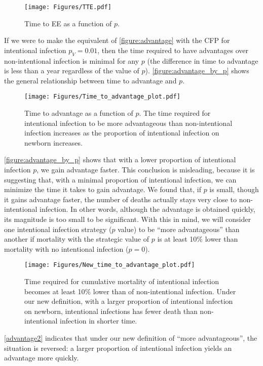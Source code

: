 \documentclass[12pt]{article}
\newcommand{\pmV}{p_{V}}
\begin{document}
\begin{figure}[H]
  \centering
  \texttt{[image: Figures/TTE.pdf]}
  \caption{Time to EE as a function of $p$.}
\label{figure:EE_by_p}
\end{figure}

If we were to make the equivalent of \autoref{figure:advantage} with the CFP for intentional infection $\pmV=0.01$, then the time required to have advantages over non-intentional infection is minimal for any $p$ (the difference in time to advantage is less than a year regardless of the value of $p$).
\autoref{figure:advantage_by_p} shows the general relationship between time to advantage and $p$.

\begin{figure}[H]
  \centering
  \texttt{[image: Figures/Time\_to\_advantage\_plot.pdf]}
  \caption{Time to advantage as a function of $p$. The time required for intentional infection to be more advantageous than non-intentional infection increases as the proportion of intentional infection on newborn increases.}
\label{figure:advantage_by_p}
\end{figure}

\autoref{figure:advantage_by_p} shows that with a lower proportion of intentional infection $p$, we gain advantage faster. This conclusion is misleading, because it is suggesting that, with a minimal proportion of intentional infection, we can minimize the time it takes to gain advantage.
We found that, if $p$ is small, though it gains advantage faster, the number of deaths actually stays very close to non-intentional infection. In other words, although the advantage is obtained quickly, its magnitude is too small to be significant.  With this in mind, we will consider one intentional infection strategy ($p$ value) to be ``more advantageous'' than another if mortality with the strategic value of $p$ is at least 10\% lower than mortality with no intentional infection ($p=0$).

\begin{figure}[H]
  \caption{Time required for cumulative mortality of intentional infection becomes at least 10\% lower than of non-intentional infection. Under our new definition, with a larger proportion of intentional infection on newborn, intentional infections has fewer death than non-intentional infection in shorter time.}\label{advantage2}
  \centering
  \texttt{[image: Figures/New\_time\_to\_advantage\_plot.pdf]}
\end{figure}
\autoref{advantage2} indicates that under our new definition of ``more advantageous'', the situation is reversed: a larger proportion of intentional infection yields an advantage more quickly.
\end{document}
